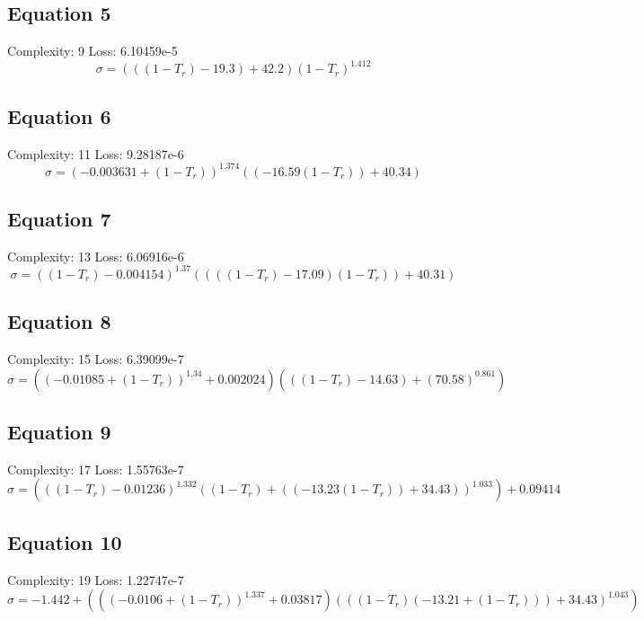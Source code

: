\documentclass[11pt]{article}
\begin{document}
\subsection*{Equation 5}
\noindent Complexity: 9 \quad Loss: 6.10459e-5 \\[4pt]
\[
\sigma = (((1 - T_r) -19.3) + 42.2) \left(1 - T_r\right)^{1.412}
\]

\subsection*{Equation 6}
\noindent Complexity: 11 \quad Loss: 9.28187e-6 \\[4pt]
\[
\sigma = \left(-0.003631 + (1 - T_r)\right)^{1.374} ((-16.59 (1 - T_r)) + 40.34)
\]

\subsection*{Equation 7}
\noindent Complexity: 13 \quad Loss: 6.06916e-6 \\[4pt]
\[
\sigma = \left((1 - T_r) - 0.004154\right)^{1.37} ((((1 - T_r) - 17.09) (1 - T_r)) + 40.31)
\]

\subsection*{Equation 8}
\noindent Complexity: 15 \quad Loss: 6.39099e-7 \\[4pt]
\[
\sigma = (\left(-0.01085 + (1 - T_r)\right)^{1.34} + 0.002024) (((1 - T_r) -14.63) + \left(70.58\right)^{0.861})
\]

\subsection*{Equation 9}
\noindent Complexity: 17 \quad Loss: 1.55763e-7 \\[4pt]
\[
\sigma = (\left((1 - T_r) - 0.01236\right)^{1.332} \left((1 - T_r) + ((-13.23 (1 - T_r)) + 34.43)\right)^{1.033}) + 0.09414
\]

\subsection*{Equation 10}
\noindent Complexity: 19 \quad Loss: 1.22747e-7 \\[4pt]
\[
\sigma = -1.442 + ((\left(-0.0106 + (1 - T_r)\right)^{1.337} + 0.03817) \left(((1 - T_r) (-13.21 + (1 - T_r))) + 34.43\right)^{1.043})
\]
\end{document}
